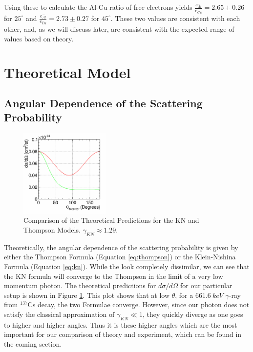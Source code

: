 \documentclass[%
 reprint,
 amsmath,amssymb,
 aps,
 pra,
]{revtex4-1}
\begin{document}
Using these to calculate the Al-Cu ratio of free electrons yields $ \frac{e^{-}_{Al}}{e^{-}_{Cu}} = 2.65 \pm 0.26$ for $25^{\circ}$ and $\frac{e^{-}_{Al}}{e^{-}_{Cu}} = 2.73 \pm 0.27$ for $45^{\circ}$. These two values are consistent with each other, and, as we will discuss later, are consistent with the expected range of values based on theory.

\section{Theoretical Model}

\subsection{Angular Dependence of the Scattering Probability}

\begin{figure}[H]
	\centering
	\includegraphics[width=0.4\textwidth]{KNvsThompson_TheoryOnly.png}
	\caption{Comparison of the Theoretical Predictions for the KN and Thompson Models. $\gamma_{KN} \approx 1.29$.}
	\label{KN_vs_Thompson_Theory}
\end{figure}

Theoretically, the angular dependence of the scattering probability is given by either the Thompson Formula (Equation \ref{eq:thompson}) or the Klein-Nishina Formula (Equation \ref{eq:kn}). While the look completely dissimilar, we can see that the KN formula will converge to the Thompson in the limit of a very low momentum photon. The theoretical predictions for $d\sigma / d\Omega$ for our particular setup is shown in Figure \ref{KN_vs_Thompson_Theory}. This plot shows that at low $\theta$, for a $661.6~keV$ $\gamma$-ray from $^{137}$Cs decay, the two Formulae converge. However, since our photon does not satisfy the classical approximation of $\gamma_{KN} \ll 1$, they quickly diverge as one goes to higher and higher angles. Thus it is these higher angles which are the most important for our comparison of theory and experiment, which can be found in the coming section.
\end{document}
